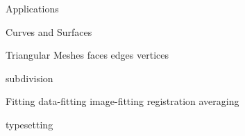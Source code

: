 \begin{plSection}{Applications}
\begin{plSection}{Curves and Surfaces}
\begin{plSection}{Triangular Meshes}
{faces}
{edges}
{vertices}
\end{plSection}%
{subdivision}
\begin{plSection}{Fitting}
{data-fitting}
{image-fitting}
{registration}
{averaging}
\end{plSection} %
\end{plSection}%
\end{plSection}%
{typesetting}
